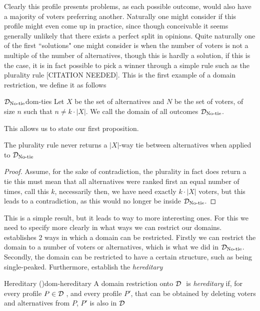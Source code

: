 Clearly this profile presents problems, as each possible outcome, would also have a majority of voters preferring another. Naturally one might consider if this profile might even come up in practice, since though conceivable it seems generally unlikely that there exists a perfect split in opinions. Quite naturally one of the first ``solutions" one might consider is when the number of voters is not a multiple of the number of alternatives, though this is hardly a solution, if this is the case, it is in fact possible to pick a winner through a simple rule such as the plurality rule [CITATION NEEDED]. This is the first example of a domain restriction, we define it as follows

\begin{definition}{$\mathcal{D}_{\text{No-tie}}$}{dom-ties}
	Let $X$ be the set of alternatives and $N$ be the set of voters, of size $n$ such that $n \neq k \cdot |X|$. We call the domain of all outcomes $\mathcal{D}_{\text{No-tie}}$.
\end{definition}

This allows us to state our first proposition.

\begin{proposition}
	The plurality rule never returns a $|X|$-way tie between alternatives when applied to $\mathcal{D}_{\text{No-tie}}$
\end{proposition}

\begin{proof}
	Assume, for the sake of contradiction, the plurality in fact does return a tie this must mean that all alternatives were ranked first an equal number of times, call this $k$, necessarily then, we have need exactly $k \cdot |X|$ voters, but this leads to a contradiction, as this would no longer be inside $\mathcal{D}_{\text{No-tie}}$.
\end{proof}

This is a simple result, but it leads to way to more interesting ones. For this we need to specify more clearly in what ways we can restrict our domains. \citet{Gaertner_2002} establishes 2 ways in which a domain can be restricted. Firstly we can restrict the domain to a number of voters or alternatives, which is what we did in $\mathcal{D}_{\text{No-tie}}$. Secondly, the domain can be restricted to have a certain structure, such as being single-peaked. Furthermore, \citet{Elkind_Lackner_Peters_2022} establish the \textit{hereditary}

\begin{definition}{Hereditary \textnormal{(\citet{Elkind_Lackner_Peters_2022})}}{dom-hereditary}
	A domain restriction onto $\mathcal{D}_{\text{ }}$ is \textit{hereditary} if, for every profile $P \in \mathcal{D}_{\text{ }}$, and every profile $P'$, that can be obtained by deleting voters and alternatives from $P$, $P'$ is also in $\mathcal{D}_{\text{ }}$
\end{definition}

